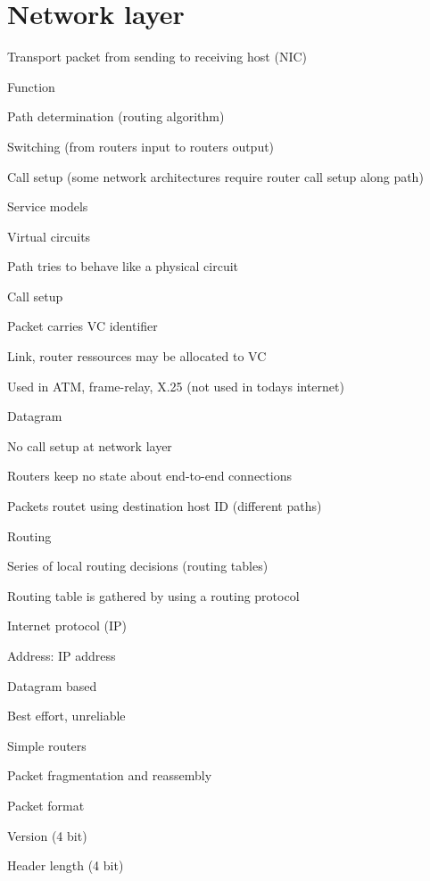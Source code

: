 \section{Network layer}
\enumstart
	\item Transport packet from sending to receiving host (NIC)
	\item Function
	\enumstart
		\item Path determination (routing algorithm)
		\item Switching (from routers input to routers output)
		\item Call setup (some network architectures require router call setup along path)
	\enumend
	\item Service models
	\enumstart
		\item Virtual circuits
		\enumstart
			\item Path tries to behave like a physical circuit
			\item Call setup
			\item Packet carries VC identifier
			\item Link, router ressources may be allocated to VC
			\item Used in ATM, frame-relay, X.25 (not used in todays internet)
		\enumend
		\item Datagram
		\enumstart
			\item No call setup at network layer
			\item Routers keep no state about end-to-end connections
			\item Packets routet using destination host ID (different paths)
		\enumend
	\enumend
	\item Routing
	\enumstart
		\item Series of local routing decisions (routing tables)
		\item Routing table is gathered by using a routing protocol
	\enumend
	\item Internet protocol (IP)
	\enumstart
		\item Address: IP address
		\item Datagram based
		\enumstart
			\item Best effort, unreliable
			\item Simple routers
			\item Packet fragmentation and reassembly
		\enumend
		\item Packet format
		\enumstart
			\item Version (4 bit)
			\item Header length (4 bit)

